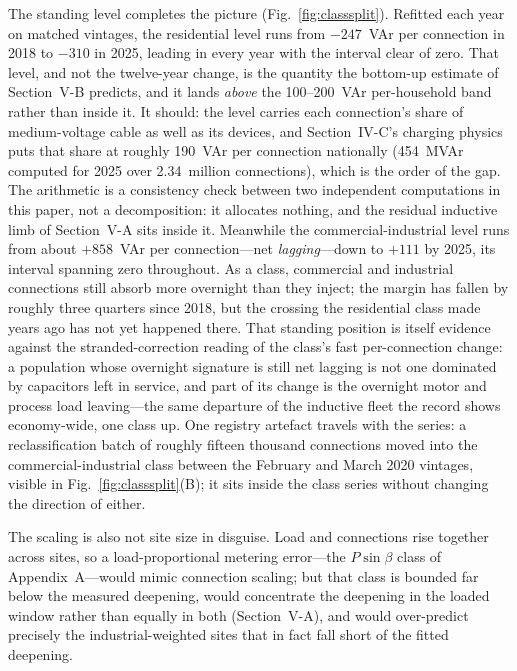 \documentclass[journal]{IEEEtran}
\begin{document}
The standing level completes the picture (Fig.~\ref{fig:classsplit}).
Refitted each year on matched vintages, the residential level runs from
$-247$~VAr per connection in 2018 to $-310$ in 2025, leading in every year
with the interval clear of zero. That level, and not the twelve-year change, is
the quantity the bottom-up estimate of Section~V-B predicts, and it lands
\emph{above} the 100--200~VAr per-household band rather than inside it. It should:
the level carries each connection's share of medium-voltage cable as well as its
devices, and Section~IV-C's charging physics puts that share at roughly 190~VAr
per connection nationally (454~MVAr computed for 2025 over 2.34~million
connections), which is the order of the gap. The arithmetic is a consistency
check between two independent computations in this paper, not a decomposition:
it allocates nothing, and the residual inductive limb of Section~V-A sits inside
it. Meanwhile the commercial-industrial level runs from
about $+858$~VAr per connection---net \emph{lagging}---down to $+111$ by
2025, its interval spanning zero throughout. As a class, commercial and
industrial connections still absorb more overnight than they inject; the
margin has fallen by roughly three quarters since 2018, but the crossing the
residential class made years ago has not yet happened there. That standing
position is itself evidence against the stranded-correction reading of the
class's fast per-connection change: a population whose overnight signature is
still net lagging is not one dominated by capacitors left in service, and
part of its change is the overnight motor and process load leaving---the
same departure of the inductive fleet the record shows economy-wide, one
class up. One registry artefact travels with the series: a reclassification
batch of roughly fifteen thousand connections moved into the
commercial-industrial class between the February and March 2020 vintages,
visible in Fig.~\ref{fig:classsplit}(B); it sits inside the class series
without changing the direction of either.

The scaling is also not site size in disguise. Load and connections rise together across sites, so a load-proportional metering
error---the $P\sin\beta$ class of Appendix~A---would mimic connection scaling;
but that class is bounded far below the measured deepening, would concentrate
the deepening in the loaded window rather than equally in both (Section~V-A),
and would over-predict precisely the industrial-weighted sites that in fact fall
short of the fitted deepening.
\end{document}
